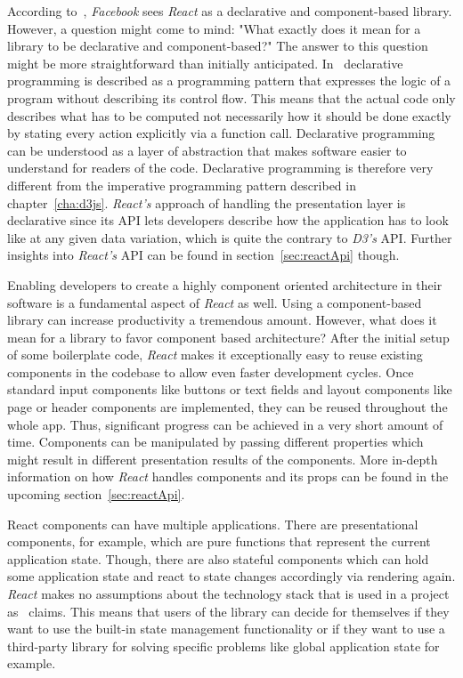 According to~\cite{React}, \emph{Facebook} sees \emph{React} as a declarative and component-based library. However, a question might come to mind: "What exactly does it mean for a library to be declarative and component-based?" The answer to this question might be more straightforward than initially anticipated. In~\cite{lloyd1994practical} declarative programming is described as a programming pattern that expresses the logic of a program without describing its control flow. This means that the actual code only describes what has to be computed not necessarily how it should be done exactly by stating every action explicitly via a function call. Declarative programming can be understood as a layer of abstraction that makes software easier to understand for readers of the code. Declarative programming is therefore very different from the imperative programming pattern described in chapter~\ref{cha:d3js}. \emph{React's} approach of handling the presentation layer is declarative since its API lets developers describe how the application has to look like at any given data variation, which is quite the contrary to \emph{D3's} API. Further insights into \emph{React's} API can be found in section~\ref{sec:reactApi} though.

Enabling developers to create a highly component oriented architecture in their software is a fundamental aspect of \emph{React} as well. Using a component-based library can increase productivity a tremendous amount. However, what does it mean for a library to favor component based architecture? After the initial setup of some boilerplate code, \emph{React} makes it exceptionally easy to reuse existing components in the codebase to allow even faster development cycles. Once standard input components like buttons or text fields and layout components like page or header components are implemented, they can be reused throughout the whole app. Thus, significant progress can be achieved in a very short amount of time. Components can be manipulated by passing different properties which might result in different presentation results of the components. More in-depth information on how \emph{React} handles components and its props can be found in the upcoming section~\ref{sec:reactApi}.

React components can have multiple applications. There are presentational components, for example, which are pure functions that represent the current application state. Though, there are also stateful components which can hold some application state and react to state changes accordingly via rendering again. \emph{React} makes no assumptions about the technology stack that is used in a project as~\cite{React} claims. This means that users of the library can decide for themselves if they want to use the built-in state management functionality or if they want to use a third-party library for solving specific problems like global application state for example.


